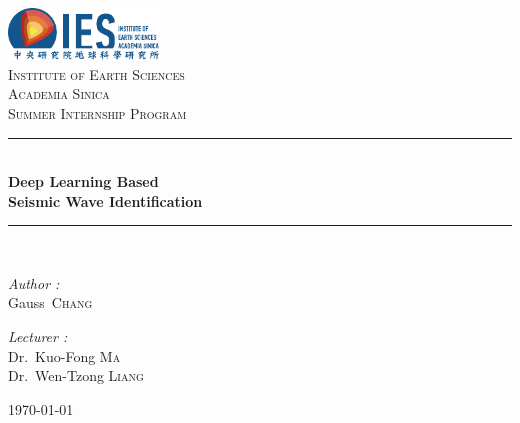 \documentclass[a4paper,12pt, oneside]{article}
\newcommand{\HRule}{\rule{\linewidth}{2pt}}
\begin{document}

\begin{titlepage}

\begin{center}


\includegraphics[width = 0.30\textwidth]{IES_logo.pdf} \\ [1cm]
\textsc{\LARGE Institute of Earth Sciences \\ Academia Sinica} \\ [1.5cm]
\textsc{\Large Summer Internship Program} \\ [0.5cm]


\HRule \\ %
{\huge \bfseries Deep Learning Based \\ Seismic Wave Identification} \\ [0.5cm]
\HRule \\ [2.5cm]

\begin{minipage}[t]{0.4\textwidth}
\begin{flushleft} \large
\emph{Author :}\\
Gauss~\textsc{Chang} \\
\end{flushleft}
\end{minipage}
%
\begin{minipage}[t]{0.4\textwidth}
\begin{flushright} \large
\emph{Lecturer :} \\
Dr.~Kuo-Fong \textsc{Ma} \\
Dr.~Wen-Tzong \textsc{Liang} \\
\end{flushright}
\end{minipage}

\vfill

{\large \today}

\end{center}

\end{titlepage}
\setcounter{page}{1}

\end{document}
